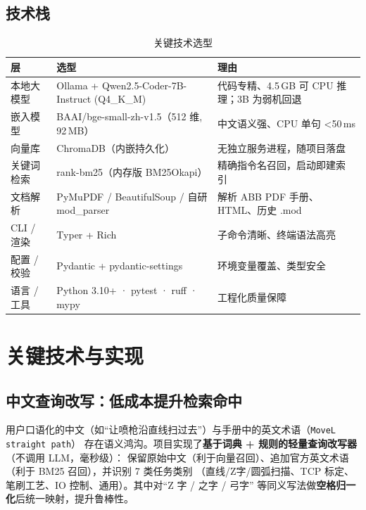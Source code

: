 \documentclass[12pt,a4paper,fontset=none]{ctexart}
\begin{document}
\subsection{技术栈}
\begin{table}[h]
\centering
\caption{关键技术选型}
\small
\begin{tabularx}{\textwidth}{@{}l l X@{}}
\toprule
\textbf{层} & \textbf{选型} & \textbf{理由} \\
\midrule
本地大模型 & Ollama + Qwen2.5-Coder-7B-Instruct (Q4\_K\_M) & 代码专精、4.5\,GB 可 CPU 推理；3B 为弱机回退 \\
嵌入模型 & BAAI/bge-small-zh-v1.5（512 维, 92\,MB） & 中文语义强、CPU 单句 <50\,ms \\
向量库 & ChromaDB（内嵌持久化） & 无独立服务进程，随项目落盘 \\
关键词检索 & rank-bm25（内存版 BM25Okapi） & 精确指令名召回，启动即建索引 \\
文档解析 & PyMuPDF / BeautifulSoup / 自研 mod\_parser & 解析 ABB PDF 手册、HTML、历史 .mod \\
CLI / 渲染 & Typer + Rich & 子命令清晰、终端语法高亮 \\
配置 / 校验 & Pydantic + pydantic-settings & 环境变量覆盖、类型安全 \\
语言 / 工具 & Python 3.10+ · pytest · ruff · mypy & 工程化质量保障 \\
\bottomrule
\end{tabularx}
\end{table}

\section{关键技术与实现}

\subsection{中文查询改写：低成本提升检索命中}
用户口语化的中文（如“让喷枪沿直线扫过去”）与手册中的英文术语（\texttt{MoveL straight path}）
存在语义鸿沟。项目实现了\textbf{基于词典 + 规则的轻量查询改写器}（不调用 LLM，毫秒级）：
保留原始中文（利于向量召回）、追加官方英文术语（利于 BM25 召回），并识别 7 类任务类别
（直线/Z字/圆弧扫描、TCP 标定、笔刷工艺、IO 控制、通用）。其中对“Z 字 / 之字 / 弓字”
等同义写法做\textbf{空格归一化}后统一映射，提升鲁棒性。
\end{document}
